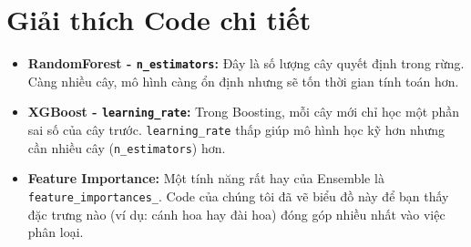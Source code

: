 \documentclass{article}
\begin{document}
\section{Giải thích Code chi tiết}
\begin{itemize}
    \item \textbf{RandomForest - \texttt{n\_estimators}:} Đây là số lượng cây quyết định trong rừng. Càng nhiều cây, mô hình càng ổn định nhưng sẽ tốn thời gian tính toán hơn.
    \item \textbf{XGBoost - \texttt{learning\_rate}:} Trong Boosting, mỗi cây mới chỉ học một phần sai số của cây trước. \texttt{learning\_rate} thấp giúp mô hình học kỹ hơn nhưng cần nhiều cây (\texttt{n\_estimators}) hơn.
    \item \textbf{Feature Importance:} Một tính năng rất hay của Ensemble là \texttt{feature\_importances\_}. Code của chúng tôi đã vẽ biểu đồ này để bạn thấy đặc trưng nào (ví dụ: cánh hoa hay đài hoa) đóng góp nhiều nhất vào việc phân loại.
\end{itemize}
\end{document}
